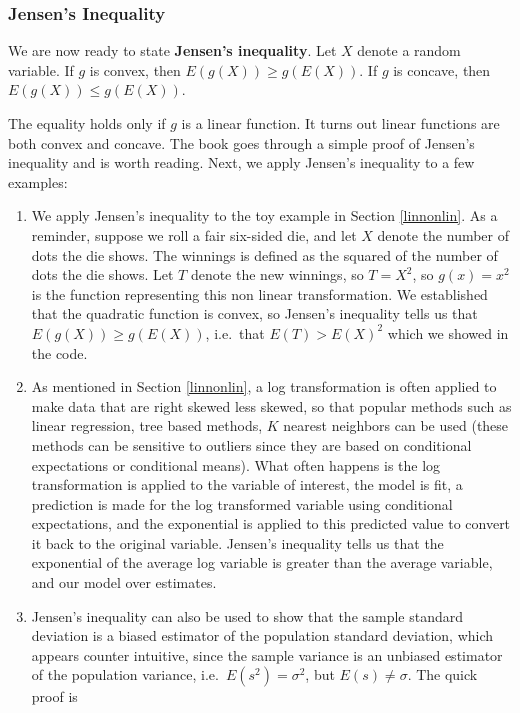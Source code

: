 \documentclass[
]{book}
\begin{document}
\hypertarget{jensens-inequality-1}{%
\subsubsection{Jensen's Inequality}\label{jensens-inequality-1}}

We are now ready to state \textbf{Jensen's inequality}. Let \(X\) denote a random variable. If \(g\) is convex, then \(E(g(X)) \geq g(E(X))\). If \(g\) is concave, then \(E(g(X)) \leq g(E(X))\).

The equality holds only if \(g\) is a linear function. It turns out linear functions are both convex and concave. The book goes through a simple proof of Jensen's inequality and is worth reading. Next, we apply Jensen's inequality to a few examples:

\begin{enumerate}
\def\labelenumi{\arabic{enumi}.}
\item
  We apply Jensen's inequality to the toy example in Section \ref{linnonlin}. As a reminder, suppose we roll a fair six-sided die, and let \(X\) denote the number of dots the die shows. The winnings is defined as the squared of the number of dots the die shows. Let \(T\) denote the new winnings, so \(T = X^2\), so \(g(x) = x^2\) is the function representing this non linear transformation. We established that the quadratic function is convex, so Jensen's inequality tells us that \(E(g(X)) \geq g(E(X))\), i.e.~that \(E(T) > E(X)^2\) which we showed in the code.
\item
  As mentioned in Section \ref{linnonlin}, a log transformation is often applied to make data that are right skewed less skewed, so that popular methods such as linear regression, tree based methods, \(K\) nearest neighbors can be used (these methods can be sensitive to outliers since they are based on conditional expectations or conditional means). What often happens is the log transformation is applied to the variable of interest, the model is fit, a prediction is made for the log transformed variable using conditional expectations, and the exponential is applied to this predicted value to convert it back to the original variable. Jensen's inequality tells us that the exponential of the average log variable is greater than the average variable, and our model over estimates.
\item
  Jensen's inequality can also be used to show that the sample standard deviation is a biased estimator of the population standard deviation, which appears counter intuitive, since the sample variance is an unbiased estimator of the population variance, i.e.~\(E(s^2) = \sigma^2\), but \(E(s) \neq \sigma\). The quick proof is
\end{enumerate}
\end{document}
